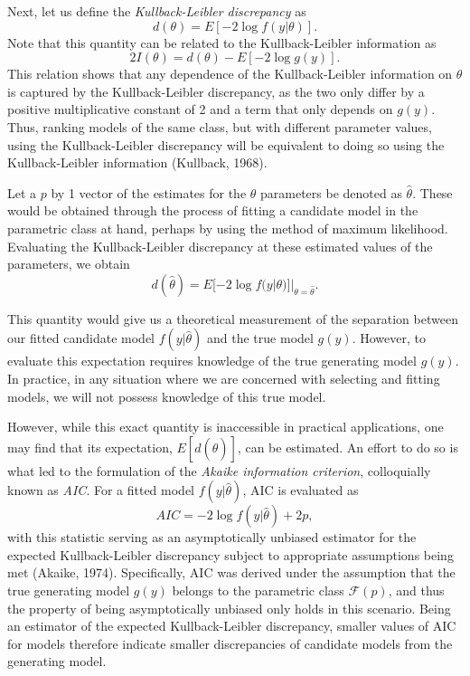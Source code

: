 		Next, let us define the \textit{Kullback-Leibler discrepancy} as
		\begin{equation*}
			d(\theta) = E[-2 \log f(y|\theta)] .
		\end{equation*}
		Note that this quantity can be related to the Kullback-Leibler information as
		\begin{equation*}
			2 I(\theta) = d(\theta) - E \left[ -2 \log g(y) \right].
		\end{equation*}
		This relation shows that any dependence of the Kullback-Leibler information on $\theta$ is captured by the Kullback-Leibler discrepancy, as the two only differ by a positive
		multiplicative constant of 2 and a term that only depends on $g(y)$. Thus, ranking models of the same class, but with different parameter values, using the Kullback-Leibler
		discrepancy will be equivalent to doing so using the Kullback-Leibler information (Kullback, 1968).
		
		Let a $p$ by 1 vector of the estimates for the $\theta$ parameters be denoted as $\hat{\theta}$. These would be obtained through the process of fitting a candidate model in the
		parametric class at hand, perhaps by using the method of maximum likelihood. Evaluating the Kullback-Leibler discrepancy at these estimated values of the parameters, we obtain
		\begin{equation*}
			d(\hat{\theta}) = E [ -2 \log f(y | \theta)]|_{\theta = \hat{\theta}}.
		\end{equation*}

		This quantity would give us a theoretical measurement of the separation between our fitted candidate model $f(y|\hat{\theta})$ and the true model $g(y)$. However, to
		evaluate this expectation requires knowledge of the true generating model $g(y)$. In practice, in any situation where we are concerned with selecting and fitting models,
		we will not possess knowledge of this true model.

		However, while this exact quantity is inaccessible in practical applications, one may find that its expectation, $E[d(\hat{\theta})]$, can be estimated. An
		effort to do so is what led to the formulation of the \textit{Akaike information criterion}, colloquially known as \textit{AIC}. For a fitted model $f(y|\hat{\theta})$,
		AIC is evaluated as
		\begin{equation*}
			AIC = -2 \log f(y|\hat{\theta}) + 2 p,
		\end{equation*}
		with this statistic serving as an asymptotically unbiased estimator for the expected Kullback-Leibler discrepancy subject to appropriate assumptions being met (Akaike, 1974). Specifically, AIC was derived
		under the assumption that the true generating model $g(y)$ belongs to the parametric class $\mathcal{F}(p)$, and thus the property of being asymptotically unbiased only
		holds in this scenario. Being an estimator of the expected Kullback-Leibler discrepancy, smaller values of AIC for models therefore indicate smaller discrepancies of candidate
		models from the generating model.  

